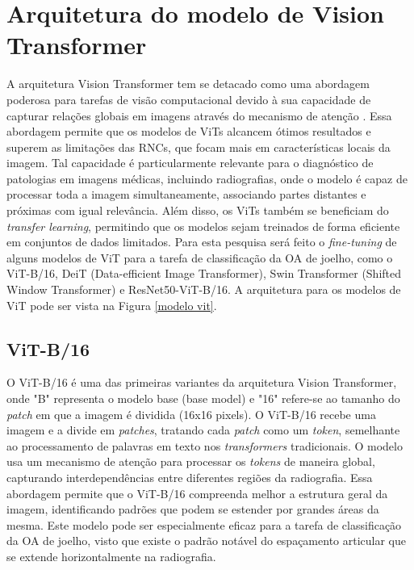 \section{Arquitetura do modelo de Vision Transformer}

A arquitetura Vision Transformer tem se detacado como uma abordagem poderosa para tarefas de visão computacional devido à sua capacidade de capturar relações globais em imagens através do mecanismo de atenção \cite{Dosovitskiy2021}. Essa abordagem permite que os modelos de ViTs alcancem ótimos resultados e superem as limitações das RNCs, que focam mais em características locais da imagem. Tal capacidade é particularmente relevante para o diagnóstico de patologias em imagens médicas, incluindo radiografias, onde o modelo é capaz de processar toda a imagem simultaneamente, associando partes distantes e próximas com igual relevância. Além disso, os ViTs também se beneficiam do \textit{transfer learning}, permitindo que os modelos sejam treinados de forma eficiente em conjuntos de dados limitados. Para esta pesquisa será feito o \textit{fine-tuning} de alguns modelos de ViT para a tarefa de classificação da OA de joelho, como o ViT-B/16, DeiT (Data-efficient Image Transformer), Swin Transformer (Shifted Window Transformer) e ResNet50-ViT-B/16. A arquitetura para os modelos de ViT pode ser vista na Figura \ref{modelo vit}.

\subsection{ViT-B/16}

O ViT-B/16 \cite{Dosovitskiy2021} é uma das primeiras variantes da arquitetura Vision Transformer, onde "B" representa o modelo base (base model) e "16" refere-se ao tamanho do \textit{patch} em que a imagem é dividida (16x16 pixels). O ViT-B/16 recebe uma imagem e a divide em \textit{patches}, tratando cada \textit{patch} como um \textit{token}, semelhante ao processamento de palavras em texto nos \textit{transformers} tradicionais. O modelo usa um mecanismo de atenção para processar os \textit{tokens} de maneira global, capturando interdependências entre diferentes regiões da radiografia. Essa abordagem permite que o ViT-B/16 compreenda melhor a estrutura geral da imagem, identificando padrões que podem se estender por grandes áreas da mesma. Este modelo pode ser especialmente eficaz para a tarefa de classificação da OA de joelho, visto que existe o padrão notável do espaçamento articular que se extende horizontalmente na radiografia.

